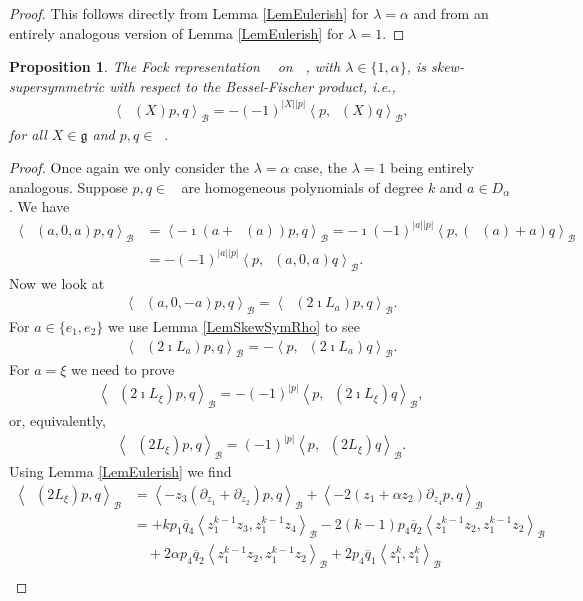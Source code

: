 \documentclass{amsart}
\newtheorem{Prop}[theorem]{Proposition}
\numberwithin{theorem}{section}
\theoremstyle{definition}
\theoremstyle{remark}
\DeclareMathOperator{\bessel}{\mathcal B_\lambda}
\DeclareMathOperator{\Fock}{\mc F_\lambda}
\newcommand{\bfip}[1]{\left<{#1}\right>_\mathcal B}
\newcommand{\pt}[1]{\partial_{#1}}
\newcommand{\mc}[1]{\mathcal{#1}}
\newcommand{\ol}[1]{\overline{#1}}
\DeclareMathOperator{\pil}{\pi_\lambda}
\DeclareMathOperator{\rol}{\rho_\lambda}
\begin{document}
\begin{proof}
This follows directly from Lemma \ref{LemEulerish} for $\lambda=\alpha$ and from an entirely analogous version of Lemma \ref{LemEulerish} for $\lambda=1$.
\end{proof}

\begin{Prop}\label{PropSkewSymRho}
The Fock representation $\rol$ on $\Fock$, with $\lambda\in\{1,\alpha\}$, is skew-supersymmetric with respect to the Bessel-Fischer product, i.e.,
\begin{align*}
\bfip{\rol(X)p,q} = - (-1)^{|X||p|}\bfip{p,\rol(X)q},
\end{align*}
for all $X\in \mathfrak{g}$ and $p,q\in \Fock$.
\end{Prop}

\begin{proof}
Once again we only consider the $\lambda=\alpha$ case, the $\lambda=1$ being entirely analogous. Suppose $p,q\in \Fock$ are homogeneous polynomials of degree $k$ and $a\in D_\alpha$. We have
\begin{align*}
\bfip{\rol(a,0,a)p,q} &= \bfip{-\imath(a+\bessel(a)) p,q} =  -\imath(-1)^{|a||p|}\bfip{ p,(\bessel(a)+a)q}\\&=- (-1)^{|a||p|}\bfip{p,\rol(a,0,a)q}.
\end{align*}
Now we look at
\begin{align*}
\bfip{\rol(a,0,-a)p,q} = \bfip{\pil(2\imath L_{a})p,q}.
\end{align*}
For $a\in\{e_1,e_2\}$ we use Lemma \ref{LemSkewSymRho} to see
\begin{align*}
\bfip{\pil(2\imath L_{a})p,q} = -\bfip{p,\pil(2\imath L_{a})q}.
\end{align*}
For $a=\xi$ we need to prove
\begin{align*}
\bfip{\pil(2\imath L_{\xi})p,q} = -(-1)^{|p|}\bfip{p,\pil(2\imath L_{\xi})q},
\end{align*}
or, equivalently,
\begin{align*}
\bfip{\pil(2 L_{\xi})p,q} = (-1)^{|p|}\bfip{p,\pil(2 L_{\xi})q}.
\end{align*}
Using Lemma \ref{LemEulerish} we find
\begin{align*}
\bfip{\pil(2 L_{\xi})p,q} &=  \bfip{-{z_3}(\pt {z_1}+\pt {z_2} )p, q} + \bfip{-2({z_1}+\alpha z_2)\pt{z_4} p, q} \\
&= +k p_1 \ol q_4\bfip{z_1^{k-1}{z_3}, z_1^{k-1}{z_4}} - 2(k-1)p_4 \ol q_2 \bfip{z_1^{k-1}{z_2}, z_1^{k-1}{z_2}}\\
&\quad  +2\alpha p_4 \ol q_2 \bfip{z_1^{k-1}{z_2}, z_1^{k-1}{z_2}}+ 2 p_4\ol q_1 \bfip{z_1^{k}, z_1^{k}}\\

\end{align*}
\end{proof}
\end{document}
